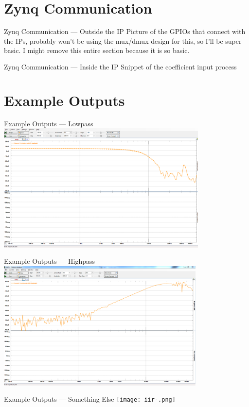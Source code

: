 \documentclass{beamer}
\begin{document}
\section{Zynq Communication}
\begin{frame}{Zynq Communication --- Outside the IP}
  Picture of the GPIOs that connect with the IPs, probably won't be using the
  mux/dmux design for this, so I'll be super basic. I might remove this entire
  section because it is so basic.
\end{frame}
\begin{frame}{Zynq Communication --- Inside the IP}
  Snippet of the coefficient input process
\end{frame}

\section{Example Outputs}
\begin{frame}{Example Outputs --- Lowpass}
  \includegraphics[height=6.5cm]
                  {very-nice-8th-order-lowpass.png}
\end{frame}
\begin{frame}{Example Outputs --- Highpass}
  \includegraphics[height=6.5cm]
                  {iir-highpass-test2.png}
\end{frame}
\begin{frame}{Example Outputs --- Something Else}
  \texttt{[image: iir-.png]}
\end{frame}
\end{document}
